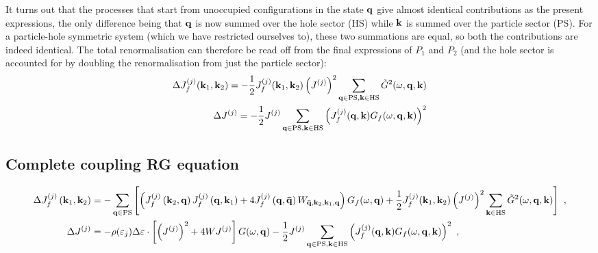 \documentclass[%
reprint,
superscriptaddress,
groupedaddress,
superscriptaddress,
onecolumn,
]{revtex4-2}
\begin{document}
It turns out that the processes that start from unoccupied configurations in the state \({\bf q}\) give almost identical contributions as the present expressions, the only difference being that \({\bf q}\) is now summed over the hole sector (HS) while \({\bf k}\) is summed over the particle sector (PS). For a particle-hole symmetric system (which we have restricted ourselves to), these two summations are equal, so both the contributions are indeed identical. The total renormalisation can therefore be read off from the final expressions of \(P_1\) and \(P_2\) (and the hole sector is accounted for by doubling the renormalisation from just the particle sector):
\begin{equation}\begin{aligned}
	\Delta J_f^{(j)}({\bf k}_1,{\bf k}_2) = -\frac{1}{2}J_f^{(j)}({\bf k}_1,{\bf k}_2) \left(J^{(j)}\right)^2 \sum_{{\bf q} \in \text{PS} ,{\bf k} \in \text{HS}}\tilde G^2(\omega, {\bf q}, {\bf k})\\
	\Delta J^{(j)} = -\frac{1}{2}J^{(j)} \sum_{{\bf q} \in \text{PS} ,{\bf k} \in \text{HS}}\left(J_f^{(j)}({\bf q},{\bf k}) G_f(\omega, {\bf q}, {\bf k})\right)^2\\
\end{aligned}\end{equation}

\subsection{Complete coupling RG equation}
\begin{equation}\begin{aligned}\label{rgEquation}
	\Delta J_f^{(j)}\left({\bf k}_1, {\bf k}_2\right) &= -\sum_{{\bf q} \in \text{PS}} \left[\left(J_f^{(j)}\left({\bf k}_2,{\bf q}\right) J_f^{(j)}\left({\bf q},{\bf k}_1\right) + 4J_f^{(j)}\left({\bf q}, {\bf \bar q}\right) W_{{\bf \bar q}, {\bf k}_2, {\bf k}_1, {\bf q}}\right) G_f(\omega, {\bf q}) + \frac{1}{2}J_f^{(j)}({\bf k}_1,{\bf k}_2) \left(J^{(j)}\right)^2 \sum_{{\bf k} \in \text{HS}}\tilde G^2(\omega, {\bf q}, {\bf k})\right]~,\\
	\Delta J^{(j)} &= - \rho(\varepsilon_j)\Delta \varepsilon\cdot\left[\left(J^{(j)}\right)^2 + 4WJ^{(j)}\right] G(\omega, {\bf q}) -\frac{1}{2}J^{(j)} \sum_{{\bf q} \in \text{PS} ,{\bf k} \in \text{HS}}\left(J_f^{(j)}({\bf q},{\bf k})G_f(\omega, {\bf q}, {\bf k})\right)^2~,
\end{aligned}\end{equation}
\end{document}
